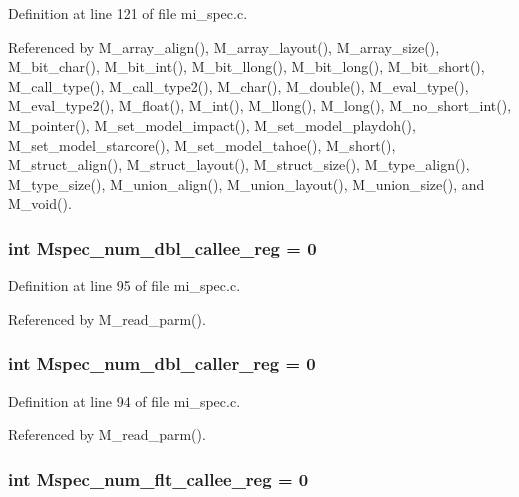 Definition at line 121 of file mi\_\-spec.c.

Referenced by M\_\-array\_\-align(), M\_\-array\_\-layout(), M\_\-array\_\-size(), M\_\-bit\_\-char(), M\_\-bit\_\-int(), M\_\-bit\_\-llong(), M\_\-bit\_\-long(), M\_\-bit\_\-short(), M\_\-call\_\-type(), M\_\-call\_\-type2(), M\_\-char(), M\_\-double(), M\_\-eval\_\-type(), M\_\-eval\_\-type2(), M\_\-float(), M\_\-int(), M\_\-llong(), M\_\-long(), M\_\-no\_\-short\_\-int(), M\_\-pointer(), M\_\-set\_\-model\_\-impact(), M\_\-set\_\-model\_\-playdoh(), M\_\-set\_\-model\_\-starcore(), M\_\-set\_\-model\_\-tahoe(), M\_\-short(), M\_\-struct\_\-align(), M\_\-struct\_\-layout(), M\_\-struct\_\-size(), M\_\-type\_\-align(), M\_\-type\_\-size(), M\_\-union\_\-align(), M\_\-union\_\-layout(), M\_\-union\_\-size(), and M\_\-void().
\subsubsection{\setlength{\rightskip}{0pt plus 5cm}int \bf{Mspec\_\-num\_\-dbl\_\-callee\_\-reg} = 0}\label{mi__spec_8c_6a572a4b44a9cff94fc7b8dd665e2bc4}




Definition at line 95 of file mi\_\-spec.c.

Referenced by M\_\-read\_\-parm().
\subsubsection{\setlength{\rightskip}{0pt plus 5cm}int \bf{Mspec\_\-num\_\-dbl\_\-caller\_\-reg} = 0}\label{mi__spec_8c_3516a6a77dc8d36a7a4b1835aa4b41f5}




Definition at line 94 of file mi\_\-spec.c.

Referenced by M\_\-read\_\-parm().
\subsubsection{\setlength{\rightskip}{0pt plus 5cm}int \bf{Mspec\_\-num\_\-flt\_\-callee\_\-reg} = 0}\label{mi__spec_8c_a7ca008797ba16f20527b28b1c724684}




